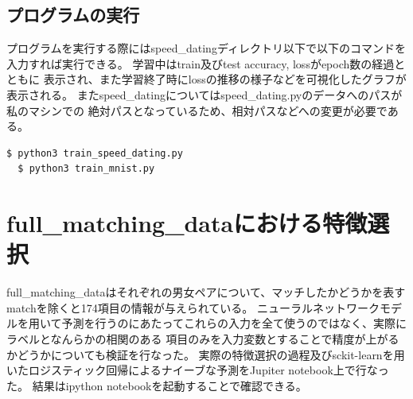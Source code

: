 \documentclass[uplatex]{jsarticle}
\begin{document}
\subsection{プログラムの実行}
プログラムを実行する際にはspeed\_datingディレクトリ以下で以下のコマンドを入力すれば実行できる。
学習中はtrain及びtest accuracy, lossがepoch数の経過とともに
表示され、また学習終了時にlossの推移の様子などを可視化したグラフが表示される。
またspeed\_datingについてはspeed\_dating.pyのデータへのパスが私のマシンでの
絶対パスとなっているため、相対パスなどへの変更が必要である。
\begin{lstlisting}[basicstyle=\ttfamily\footnotesize, frame=single]
  $ python3 train_speed_dating.py
  $ python3 train_mnist.py 
\end{lstlisting}

\section{full\_matching\_dataにおける特徴選択}
full\_matching\_dataはそれぞれの男女ペアについて、マッチしたかどうかを表すmatchを除くと174項目の情報が与えられている。
ニューラルネットワークモデルを用いて予測を行うのにあたってこれらの入力を全て使うのではなく、実際にラベルとなんらかの相関のある
項目のみを入力変数とすることで精度が上がるかどうかについても検証を行なった。
実際の特徴選択の過程及びsckit-learnを用いたロジスティック回帰によるナイーブな予測をJupiter notebook上で行なった。
結果はipython notebookを起動することで確認できる。
\end{document}
